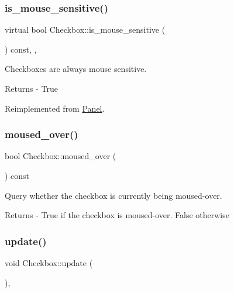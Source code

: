 \subsubsection{\texorpdfstring{is\+\_\+mouse\+\_\+sensitive()}{is\_mouse\_sensitive()}}
{\footnotesize\ttfamily virtual bool Checkbox\+::is\+\_\+mouse\+\_\+sensitive (\begin{DoxyParamCaption}{ }\end{DoxyParamCaption}) const\hspace{0.3cm}{\ttfamily [inline]}, {\ttfamily [override]}, {\ttfamily [virtual]}}

Checkboxes are always mouse sensitive. \begin{DoxyReturn}{Returns}
-\/ True 
\end{DoxyReturn}


Reimplemented from \mbox{\hyperlink{class_panel_a607fe6e1be6fd056f199fa817a4dedda}{Panel}}.

\mbox{\label{class_checkbox_a6780c6fb30c8b7cec8b55943ec31f1f4}} 
\subsubsection{\texorpdfstring{moused\+\_\+over()}{moused\_over()}}
{\footnotesize\ttfamily bool Checkbox\+::moused\+\_\+over (\begin{DoxyParamCaption}{ }\end{DoxyParamCaption}) const}

Query whether the checkbox is currently being moused-\/over. \begin{DoxyReturn}{Returns}
-\/ True if the checkbox is moused-\/over. False otherwise 
\end{DoxyReturn}
\mbox{\label{class_checkbox_a69c9fb9ce334fc8ff76c49447f1e002d}} 
\subsubsection{\texorpdfstring{update()}{update()}}
{\footnotesize\ttfamily void Checkbox\+::update (\begin{DoxyParamCaption}{ }\end{DoxyParamCaption})\hspace{0.3cm}{\ttfamily [override]}, {\ttfamily [virtual]}}

